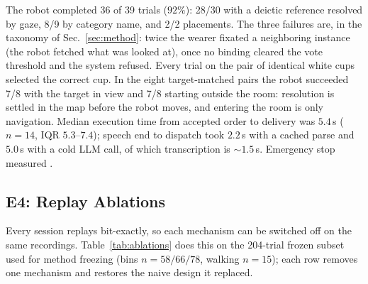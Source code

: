 The robot completed 36 of 39 trials ($92\%$): 28/30 with a deictic
reference resolved by gaze, 8/9 by category name, and 2/2 placements.
The three failures are, in the taxonomy of Sec.~\ref{sec:method}:
twice the wearer fixated a neighboring instance (the robot fetched
what was looked at), once no binding cleared the vote threshold and
the system refused. Every trial on the pair of identical white cups
selected the correct cup. In the eight target-matched pairs the robot
succeeded 7/8 with the target in view and 7/8 starting outside the
room: resolution is settled in the map before the robot moves, and
entering the room is only navigation. Median execution time from
accepted order to delivery was $5.4$\,s ($n{=}14$, IQR $5.3$--$7.4$);
speech end to dispatch took $2.2$\,s with a cached parse and $5.0$\,s
with a cold LLM call, of which transcription is $\sim$$1.5$\,s.
Emergency stop measured .

\subsection{E4: Replay Ablations}
\label{sec:ablation_results}

Every session replays bit-exactly, so each mechanism can be switched
off on the same recordings. Table~\ref{tab:ablations} does this on the
204-trial frozen subset used for method freezing (bins $n=58/66/78$,
walking $n=15$); each row removes one mechanism and restores the naive
design it replaced.

